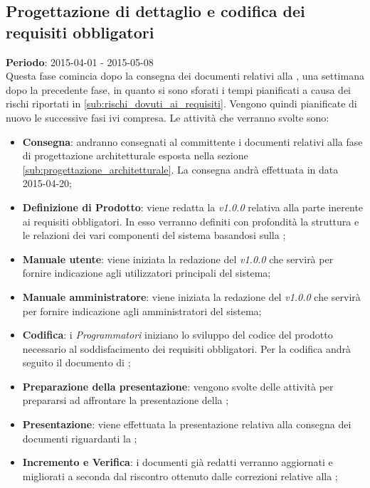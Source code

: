 	\subsection{Progettazione di dettaglio e codifica dei requisiti obbligatori} %
	\label{sub:progettazione_di_dettaglio_e_codifica_dei_requisiti_obbligatori}
	\textbf{Periodo}:  2015-04-01 - 2015-05-08 \\
	Questa fase comincia dopo la consegna dei documenti relativi alla \RPmin, una settimana dopo la precedente fase, in quanto si sono sforati i tempi pianificati a causa dei rischi riportati in \ref{sub:rischi_dovuti_ai_requisiti}. Vengono quindi pianificate di nuovo le successive fasi ivi compresa.
	Le attività che verranno svolte sono:
		\begin{itemize}
			\item \textbf{Consegna}: andranno consegnati al committente i documenti relativi alla fase di progettazione architetturale esposta nella sezione \ref{sub:progettazione_architetturale}. La consegna andrà effettuata in data 2015-04-20;
			\item \textbf{Definizione di Prodotto}: viene redatta la \docNameDdP{} \emph{v1.0.0} relativa alla parte inerente ai requisiti obbligatori. In esso verranno definiti con profondità la struttura e le relazioni dei vari componenti del sistema basandosi sulla \docNameVersionST;
			\item \textbf{Manuale utente}: viene iniziata la redazione del \docNameMU{} \emph{v1.0.0} che servirà per fornire indicazione agli utilizzatori principali del sistema;
			\item \textbf{Manuale amministratore}: viene iniziata la redazione del \docNameMA{} \emph{v1.0.0} che servirà per fornire indicazione agli amministratori del sistema;
			\item \textbf{Codifica}: i \emph{Programmatori} iniziano lo sviluppo del codice del prodotto necessario al soddisfacimento dei requisiti obbligatori. Per la codifica andrà seguito il documento di \docNameVersionDdP;
			\item \textbf{Preparazione della presentazione}: vengono svolte delle attività per prepararsi ad affrontare la presentazione della \RPmin;
			\item \textbf{Presentazione}: viene effettuata la presentazione relativa alla consegna dei documenti riguardanti la \RPmin;

			\item \textbf{Incremento e Verifica}: i documenti già redatti verranno aggiornati e migliorati a seconda dal riscontro ottenuto dalle correzioni relative alla \RPmin;
		\end{itemize}
		

